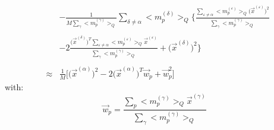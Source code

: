 \documentclass[a4paper,11pt]{article}
\begin{document}
\begin{equation}
\begin{array}{lll}
	&& - \frac{1}{M \sum\limits_\gamma \big< m_p^{(\gamma)} \big>_Q}
		\sum\limits_{\delta \neq \alpha} \big< m_p^{(\delta)}
		\big>_Q \Bigg\{ \frac{\sum\limits_{\varepsilon \neq \alpha} 
		\big< m_p^{(\varepsilon)} \big>_Q 
		\big(\vec{x}^{(\varepsilon)} \big)^2 }{
			\sum\limits_\gamma \big< m_p^{(\gamma)} \big>_Q} \\\\
	&& -2 \frac{\big(\vec{x}^{(\delta)} \big)^T 
			\sum\limits_{\varepsilon \neq \alpha} 
			\big< m_p^{(\varepsilon)} \big>_Q 
			\vec{x}^{(\varepsilon)}}{
				\sum\limits_\gamma \big< m_p^{(\gamma)}
				\big>_Q} + \big( \vec{x}^{(\delta)} \big)^2
		\Bigg\} \\\\
	& \approx & \frac{1}{M} \bigg[ \big( \vec{x}^{(\alpha)} \big)^2 
		-2 \big( \vec{x}^{(\alpha)} \big)^T \vec{w}_p + \vec{w}_p^2
		\bigg]
	\end{array}
\end{equation}
with:
\begin{equation}
	\vec{w}_p = \frac{\sum\limits_p \big< m_p^{(\gamma)} \big>_Q
			\vec{x}^{(\gamma)} }{ \sum\limits_\gamma
				\big< m_p^{(\gamma)} \big>_Q}
\end{equation}
\end{document}
